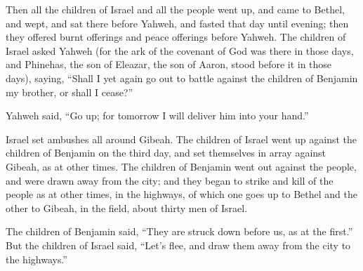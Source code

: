  Then all the children of Israel and all the people went
up, and came to Bethel, and wept, and sat there before Yahweh, and
fasted that day until evening; then they offered burnt offerings and
peace offerings before Yahweh.  The children of Israel
asked Yahweh (for the ark of the covenant of God was there in those
days,  and Phinehas, the son of Eleazar, the son of
Aaron, stood before it in those days), saying, ``Shall I yet again go
out to battle against the children of Benjamin my brother, or shall I
cease?''

Yahweh said, ``Go up; for tomorrow I will deliver him into your hand.''

 Israel set ambushes all around Gibeah. 
The children of Israel went up against the children of Benjamin on the
third day, and set themselves in array against Gibeah, as at other
times.  The children of Benjamin went out against the
people, and were drawn away from the city; and they began to strike and
kill of the people as at other times, in the highways, of which one goes
up to Bethel and the other to Gibeah, in the field, about thirty men of
Israel.

 The children of Benjamin said, ``They are struck down
before us, as at the first.'' But the children of Israel said, ``Let's
flee, and draw them away from the city to the highways.''

